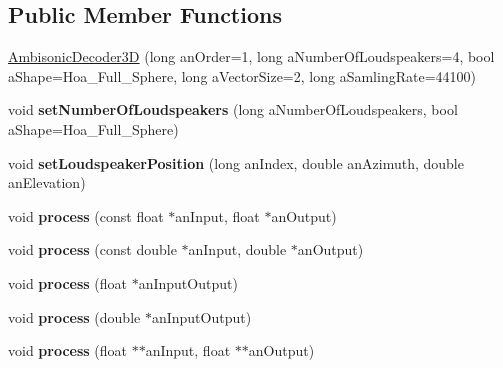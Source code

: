 \subsection*{Public Member Functions}
\begin{DoxyCompactItemize}
\item 
\hyperlink{class_ambisonic_decoder3_d_ab6f7d1512947f685d4ec43b80f45d16e}{Ambisonic\-Decoder3\-D} (long an\-Order=1, long a\-Number\-Of\-Loudspeakers=4, bool a\-Shape=Hoa\-\_\-\-Full\-\_\-\-Sphere, long a\-Vector\-Size=2, long a\-Samling\-Rate=44100)
\item 
\hypertarget{class_ambisonic_decoder3_d_a910db37deb4ad6fd574a43d692888842}{void {\bfseries set\-Number\-Of\-Loudspeakers} (long a\-Number\-Of\-Loudspeakers, bool a\-Shape=Hoa\-\_\-\-Full\-\_\-\-Sphere)}\label{class_ambisonic_decoder3_d_a910db37deb4ad6fd574a43d692888842}

\item 
\hypertarget{class_ambisonic_decoder3_d_a646c9ad31367db67b001964be4692145}{void {\bfseries set\-Loudspeaker\-Position} (long an\-Index, double an\-Azimuth, double an\-Elevation)}\label{class_ambisonic_decoder3_d_a646c9ad31367db67b001964be4692145}

\item 
\hypertarget{class_ambisonic_decoder3_d_adb378983f0ac5c5dbb27f69f02fd2993}{void {\bfseries process} (const float $\ast$an\-Input, float $\ast$an\-Output)}\label{class_ambisonic_decoder3_d_adb378983f0ac5c5dbb27f69f02fd2993}

\item 
\hypertarget{class_ambisonic_decoder3_d_aacbe0f5139bc59edd8b12693d84388b6}{void {\bfseries process} (const double $\ast$an\-Input, double $\ast$an\-Output)}\label{class_ambisonic_decoder3_d_aacbe0f5139bc59edd8b12693d84388b6}

\item 
\hypertarget{class_ambisonic_decoder3_d_ad240e005c51cd3a84fe8c636328fa531}{void {\bfseries process} (float $\ast$an\-Input\-Output)}\label{class_ambisonic_decoder3_d_ad240e005c51cd3a84fe8c636328fa531}

\item 
\hypertarget{class_ambisonic_decoder3_d_a03b5845692d6110b5c568bbd649dc088}{void {\bfseries process} (double $\ast$an\-Input\-Output)}\label{class_ambisonic_decoder3_d_a03b5845692d6110b5c568bbd649dc088}

\item 
\hypertarget{class_ambisonic_decoder3_d_aedeacd2f05d352ac0a22a448b649b3f3}{void {\bfseries process} (float $\ast$$\ast$an\-Input, float $\ast$$\ast$an\-Output)}\label{class_ambisonic_decoder3_d_aedeacd2f05d352ac0a22a448b649b3f3}


\end{DoxyCompactItemize}
